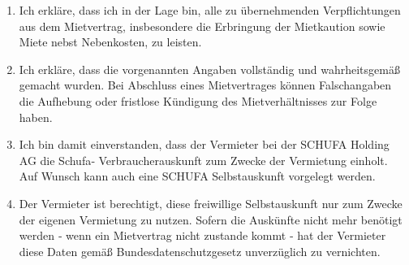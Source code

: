 \documentclass[a4paper]{scrartcl}
\begin{document}
\begin{enumerate}[I]
\item Ich erkläre, dass ich in der Lage bin, alle zu übernehmenden
      Verpflichtungen aus dem Mietvertrag, insbesondere die Erbringung der
      Mietkaution sowie Miete nebst Nebenkosten, zu leisten.
\item Ich erkläre, dass die vorgenannten Angaben vollständig und wahrheitsgemäß
      gemacht wurden. Bei Abschluss eines Mietvertrages können Falschangaben
      die Aufhebung oder fristlose Kündigung des Mietverhältnisses zur Folge
      haben.
\item Ich bin damit einverstanden, dass der Vermieter bei der SCHUFA Holding AG die Schufa‐
      Verbraucherauskunft zum Zwecke der Vermietung einholt. Auf Wunsch kann
      auch eine SCHUFA Selbstauskunft vorgelegt werden.
\item Der Vermieter ist berechtigt, diese freiwillige Selbstauskunft nur zum
      Zwecke der eigenen Vermietung zu nutzen. Sofern die Auskünfte nicht mehr
      benötigt werden ‐ wenn ein Mietvertrag nicht zustande kommt ‐ hat der
      Vermieter diese Daten gemäß Bundesdatenschutzgesetz unverzüglich zu
      vernichten.
\end{enumerate}
\end{document}
